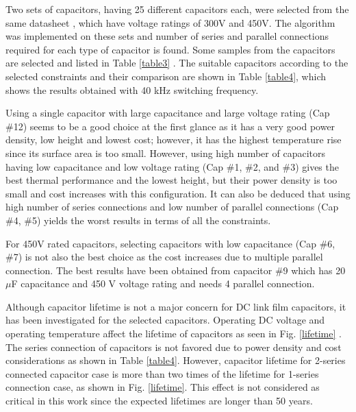 \documentclass[conference,a4paper,twocolumn]{IEEEtran}
\begin{document}
Two sets of capacitors, having 25 different capacitors each, were selected from the same datasheet \cite{Polypropylene2009}, which have voltage ratings of 300V and 450V. The algorithm was implemented on these sets and number of series and parallel connections required for each type of capacitor is found. Some samples from the capacitors are selected and listed in Table \ref{table3} \cite{Polypropylene2009}. The suitable capacitors according to the selected constraints and their comparison are shown in Table \ref{table4}, which shows the results obtained with 40 kHz switching frequency.

Using a single capacitor with large capacitance and large voltage rating (Cap \#12) seems to be a good choice at the first glance as it has a very good power density, low height and lowest cost; however, it has the highest temperature rise since its surface area is too small. However, using high number of capacitors having low capacitance and low voltage rating (Cap \#1, \#2, and \#3) gives the best thermal performance and the lowest height, but their power density is too small and cost increases with this configuration. It can also be deduced that using high number of series connections and low number of parallel connections (Cap \#4, \#5) yields the worst results in terms of all the constraints.

For 450V rated capacitors, selecting capacitors with low capacitance (Cap \#6, \#7) is not also the best choice as the cost increases due to multiple parallel connection. The best results have been obtained from capacitor \#9 which has 20 $\mu$F capacitance and 450 V voltage rating and needs 4 parallel connection.

Although capacitor lifetime is not a major concern for DC link film capacitors, it has been investigated for the selected capacitors. Operating DC voltage and operating temperature affect the lifetime of capacitors as seen in Fig. \ref{lifetime} \cite{Polypropylene2009}. The series connection of capacitors is not favored due to power density and cost considerations as shown in Table \ref{table4}. However, capacitor lifetime for 2-series connected capacitor case is more than two times of the lifetime for 1-series connection case, as shown in Fig. \ref{lifetime}. This effect is not considered as critical in this work since the expected lifetimes are longer than 50 years.
\end{document}
